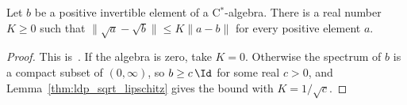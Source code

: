 \begin{lemma}
    \label{thm:ldp_sqrt_lipschitz_constant}
    \leanok
    Let $b$ be a positive invertible element of a C$^*$-algebra. There is a
    real number $K\ge0$ such that
    $\lVert\sqrt a-\sqrt b\rVert\le K\lVert a-b\rVert$ for every positive
    element $a$.
\end{lemma}
\begin{proof}
    \leanok
    This is~\cite[``Lipschitz constant of the square root at an invertible
        positive element'']{QICLean2026Blueprint}.
    If the algebra is zero, take $K=0$. Otherwise the spectrum of $b$ is a
    compact subset of $(0,\infty)$, so $b\ge c\,\Id$ for some real $c>0$, and
    Lemma~\ref{thm:ldp_sqrt_lipschitz} gives the bound with
    $K=1/\sqrt c$.
\end{proof}

